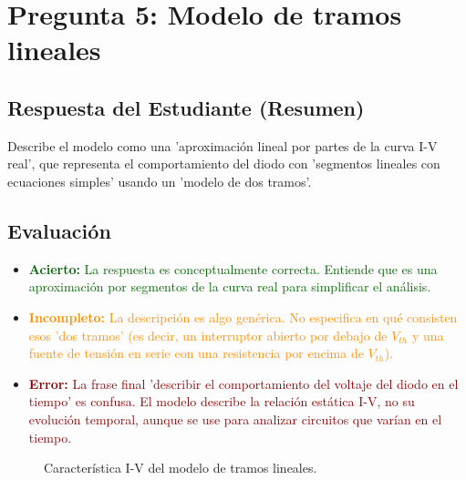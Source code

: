 \documentclass[12pt, a4paper]{article}
\newcommand{\acierto}[1]{\textcolor{darkgreen}{\textbf{Acierto:} #1}}
\newcommand{\error}[1]{\textcolor{darkred}{\textbf{Error:} #1}}
\newcommand{\incompleto}[1]{\textcolor{darkorange}{\textbf{Incompleto:} #1}}
\begin{document}
\section{Pregunta 5: Modelo de tramos lineales}

\subsection*{Respuesta del Estudiante (Resumen)}
Describe el modelo como una 'aproximación lineal por partes de la curva I-V real', que representa el comportamiento del diodo con 'segmentos lineales con ecuaciones simples' usando un 'modelo de dos tramos'.

\subsection*{Evaluación}
\begin{itemize}
    \item \acierto{La respuesta es conceptualmente correcta. Entiende que es una aproximación por segmentos de la curva real para simplificar el análisis.}
    \item \incompleto{La descripción es algo genérica. No especifica en qué consisten esos 'dos tramos' (es decir, un interruptor abierto por debajo de $V_{th}$ y una fuente de tensión en serie con una resistencia por encima de $V_{th}$).}
    \item \error{La frase final 'describir el comportamiento del voltaje del diodo en el tiempo' es confusa. El modelo describe la relación estática I-V, no su evolución temporal, aunque se use para analizar circuitos que varían en el tiempo.}
\end{itemize}

\begin{figure}[h!]
    \centering
    \caption{Característica I-V del modelo de tramos lineales.}
\end{figure}
\end{document}
